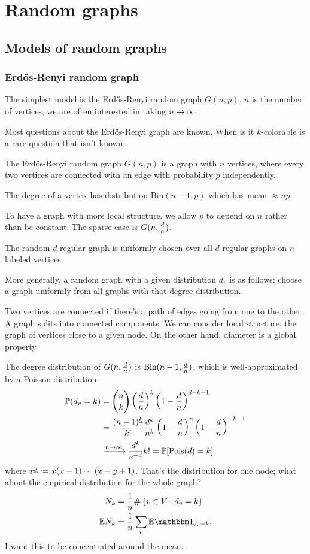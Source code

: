 \chapter{Random graphs}

\section{Models of random graphs}
\subsection{Erd\H os-Renyi random graph}
The simplest model is the Erd\H os-Renyi random graph $G(n,p)$. $n$ is the number of vertices, we are often interested in taking $n\to \infty$.

Most questions about the Erd\H os-Renyi graph are known. When is it $k$-colorable is a rare question that isn't known.

\begin{df}
The Erd\H os-Renyi random graph $G(n,p)$ is a graph with $n$ vertices, where every two vertices are connected with an edge with probability $p$ independently.
\end{df}
The degree of a vertex has distribution $\text{Bin}(n-1,p)$ which has mean $\approx np$.

To have a graph with more local structure, we allow $p$ to depend on $n$ rather than be constant. The sparse case is $G(n,\frac{d}{n})$.

\begin{df}
The random $d$-regular graph is uniformly chosen over all $d$-regular graphs on $n$-labeled vertices.
\end{df}
More generally, a random graph with a given distribution $d_v$ is as follows: %
choose a graph uniformly from all graphs with that degree distribution. 

Two vertices are connected if there's a path of edges going from one to the other. 
A graph splits into connected components. 
We can consider local structure: the graph of vertices close to a given node.
On the other hand, diameter is a global property.

The degree distribution of $G(n,\frac{d}{n})$ is $\text{Bin}(n-1,\frac{d}{n})$, which is well-approximated by a Poisson distribution.
\begin{align}
\mathbb{P}(d_v=k) &= \binom nk \left( {\frac{d}{n}} \right)^k \left( {1-\frac{d}{n}} \right)^{d-k-1}\\
&= \frac{(n-1)^{\underline{k}}}{k!} \frac{d^k}{n^k} \left( {1-\frac{d}{n}} \right)^n \left( {1-\frac{d}{n}} \right)^{-k-1}\\
&\xrightarrow{n\to \infty} \frac{d^k}{e^{-d}}{k!} = \mathbb{P}[\text{Pois}(d)=k]
\end{align}
where $x^{\underline{y}}:= x(x-1)\cdots (x-y+1)$.
That's the distribution for one node; what about the empirical distribution for the whole graph?
%
\begin{align}
N_k &= \rc{n}\#\set{v\in V}{d_v=k}\\  
\E N_k &= \rc n \sum_v \E \one_{d_v=k}.
\end{align}
I want this to be concentrated around the mean.

